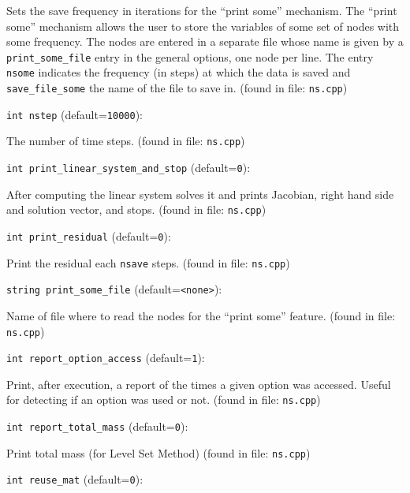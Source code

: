 Sets the save frequency in iterations for the ``print some''
mechanism. 
\label{sec:print_some}
The ``print some'' mechanism allows the user to store the variables of
some set of nodes with some frequency. The nodes are entered in a
separate file whose name is given by a \verb+print_some_file+ entry in
the general options, one node per line. The entry \verb+nsome+
indicates the frequency (in steps) at which the data is saved and
\verb+save_file_some+ the name of the file to save in. 
 (found in file: \verb+ns.cpp+)
\item\verb+int nstep+ {\rm(default=\verb|10000|)}:

The number of time steps. 
 (found in file: \verb+ns.cpp+)
\item\verb+int print_linear_system_and_stop+ {\rm(default=\verb|0|)}:

After computing the linear system solves it and prints Jacobian,
right hand side and solution vector, and stops. 
 (found in file: \verb+ns.cpp+)
\item\verb+int print_residual+ {\rm(default=\verb|0|)}:

Print the residual each  \verb+nsave+  steps. 
 (found in file: \verb+ns.cpp+)
\item\verb+string print_some_file+ {\rm(default=\verb|<none>|)}:

Name of file where to read the nodes for the ``print some'' 
feature. 
 (found in file: \verb+ns.cpp+)
\item\verb+int report_option_access+ {\rm(default=\verb|1|)}:

Print, after execution, a report of the times a given option
was accessed. Useful for detecting if an option was used or not.
 (found in file: \verb+ns.cpp+)
\item\verb+int report_total_mass+ {\rm(default=\verb|0|)}:

Print total mass (for Level Set Method)
 (found in file: \verb+ns.cpp+)
\item\verb+int reuse_mat+ {\rm(default=\verb|0|)}:

